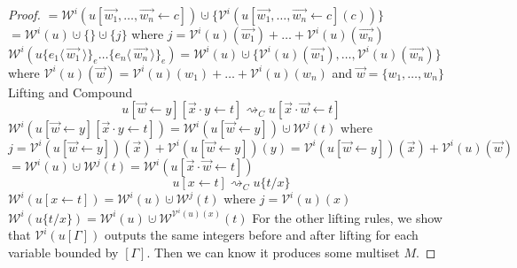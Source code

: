 \documentclass[a4paper,UKenglish,cleveref, autoref]{lipics-v2019}
\newcommand{\set}[1]{ \{ #1 \} }
\newcommand{\share}[3]{#1 [#2 \leftarrow #3]}
\newcommand{\fakedist}[2]{#1 \langle \, #2 \, \rangle}
\newcommand{\sub}[3]{#1 \{ #2 / #3 \}}
\newcommand{\exor}[3]{#1 \{ \fakedist{#2}{#3} \}_{e}}
\newcommand{\weight}[2]{\mathcal{W}^{#1}(#2)}
\newcommand{\weightvar}[2]{\mathcal{V}^{#1}(#2)}
\begin{document}
\begin{proof}
$= \weight{i}{u \share{}{\vec{w_{1}}, \dots, \vec{w_{n}}}{c}} \cupdot \set{\weightvar{i}{u \share{}{\vec{w_{1}}, \dots, \vec{w_{n}}}{c}(c)}}$
\newline
$= \weight{i}{u} \cupdot \set{} \cupdot \set{j}$
\newline
where $j = \weightvar{i}{u}(\vec{w_{1}}) + \dots + \weightvar{i}{u}(\vec{w_{n}})$
\newline
$\weight{i}{\exor{\exor{u}{e_{1}}{\vec{w_{1}}} \dots}{e_{n}}{\vec{w_{n}}}} = \weight{i}{u} \cupdot \set{\weightvar{i}{u}(\vec{w_{1}}), \dots , \weightvar{i}{u}(\vec{w_{n}})}$
\newline
where $\weightvar{i}{u}(\vec{w}) = \weightvar{i}{u}(w_{1}) + \dots + \weightvar{i}{u}(w_{n})$ and $\vec{w} = \set{w_{1}, \dots, w_{n}}$
\newline
\newline
Lifting and Compound
$$\share{\share{u}{\vec{w}}{y}}{\vec{x} \cdot y}{t} \rightsquigarrow_{C} \share{u}{\vec{x} \cdot \vec{w}}{t}$$
$\weight{i}{\share{\share{u}{\vec{w}}{y}}{\vec{x} \cdot y}{t}} = \weight{i}{\share{u}{\vec{w}}{y}} \cupdot \weight{j}{t}$
\newline
where $j = \weightvar{i}{\share{u}{\vec{w}}{y}}(\vec{x}) + \weightvar{i}{\share{u}{\vec{w}}{y}}(y) = \weightvar{i}{\share{u}{\vec{w}}{y}}(\vec{x}) + \weightvar{i}{u}(\vec{w})$
\newline
$= \weight{i}{u} \cupdot \weight{j}{t} = \weight{i}{\share{u}{\vec{x} \cdot \vec{w}}{t}}$
\newline
\newline
$$\share{u}{x}{t} \rightsquigarrow_{C} \sub{u}{t}{x} $$
$\weight{i}{\share{u}{x}{t}} = \weight{i}{u} \cupdot \weight{j}{t}$
\newline
where $j = \weightvar{i}{u}(x)$
\newline
$\weight{i}{ \sub{u}{t}{x}} = \weight{i}{u} \cupdot \weight{\weightvar{i}{u}(x)}{t}$
\newline
\newline
For the other lifting rules, we show that $\weightvar{i}{u[\Gamma]}$ outputs the same integers before and after lifting for each variable bounded by $[\Gamma]$. Then we can know it produces some multiset $M$.


\end{proof}
\end{document}
